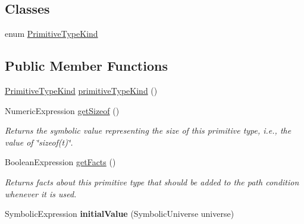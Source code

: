 \subsection*{Classes}
\begin{DoxyCompactItemize}
\item 
enum \hyperlink{enumedu_1_1udel_1_1cis_1_1vsl_1_1civl_1_1model_1_1IF_1_1type_1_1CIVLPrimitiveType_1_1PrimitiveTypeKind}{Primitive\+Type\+Kind}
\end{DoxyCompactItemize}
\subsection*{Public Member Functions}
\begin{DoxyCompactItemize}
\item 
\hyperlink{enumedu_1_1udel_1_1cis_1_1vsl_1_1civl_1_1model_1_1IF_1_1type_1_1CIVLPrimitiveType_1_1PrimitiveTypeKind}{Primitive\+Type\+Kind} \hyperlink{interfaceedu_1_1udel_1_1cis_1_1vsl_1_1civl_1_1model_1_1IF_1_1type_1_1CIVLPrimitiveType_af1dc0801fb7fdb522cb49e2ca9b53467}{primitive\+Type\+Kind} ()
\item 
Numeric\+Expression \hyperlink{interfaceedu_1_1udel_1_1cis_1_1vsl_1_1civl_1_1model_1_1IF_1_1type_1_1CIVLPrimitiveType_af4eb0df58b2a3fb7be600d2daf3e8357}{get\+Sizeof} ()
\begin{DoxyCompactList}\small\item\em Returns the symbolic value representing the size of this primitive type, i.\+e., the value of \char`\"{}sizeof(t)\char`\"{}. \end{DoxyCompactList}\item 
Boolean\+Expression \hyperlink{interfaceedu_1_1udel_1_1cis_1_1vsl_1_1civl_1_1model_1_1IF_1_1type_1_1CIVLPrimitiveType_a8a4ecb9554c8958a5e3b1982caee7268}{get\+Facts} ()
\begin{DoxyCompactList}\small\item\em Returns facts about this primitive type that should be added to the path condition whenever it is used. \end{DoxyCompactList}\item 
\hypertarget{interfaceedu_1_1udel_1_1cis_1_1vsl_1_1civl_1_1model_1_1IF_1_1type_1_1CIVLPrimitiveType_a51df81c56dc32769f32fa9e3af801136}{}Symbolic\+Expression {\bfseries initial\+Value} (Symbolic\+Universe universe)\label{interfaceedu_1_1udel_1_1cis_1_1vsl_1_1civl_1_1model_1_1IF_1_1type_1_1CIVLPrimitiveType_a51df81c56dc32769f32fa9e3af801136}

\end{DoxyCompactItemize}


